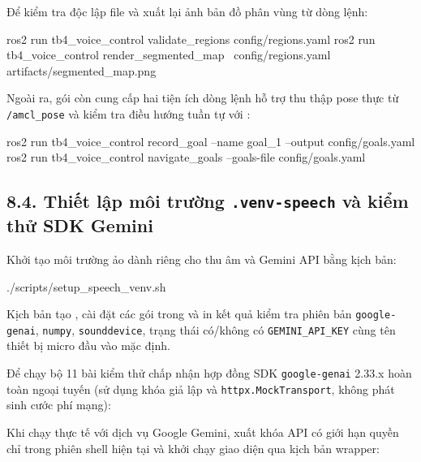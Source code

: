Để kiểm tra độc lập file  và xuất lại ảnh bản đồ phân vùng từ dòng lệnh:

\begin{svcode}
ros2 run tb4_voice_control validate_regions config/regions.yaml
ros2 run tb4_voice_control render_segmented_map \
  config/regions.yaml artifacts/segmented_map.png
\end{svcode}

Ngoài ra, gói còn cung cấp hai tiện ích dòng lệnh hỗ trợ thu thập pose thực từ \texttt{/amcl\_pose} và kiểm tra điều hướng tuần tự với :

\begin{svcode}
ros2 run tb4_voice_control record_goal --name goal_1 --output config/goals.yaml
ros2 run tb4_voice_control navigate_goals --goals-file config/goals.yaml
\end{svcode}

\subsection*{8.4. Thiết lập môi trường \texttt{.venv-speech} và kiểm thử SDK Gemini}

Khởi tạo môi trường ảo dành riêng cho thu âm và Gemini API bằng kịch bản:

\begin{svcode}
./scripts/setup_speech_venv.sh
\end{svcode}

Kịch bản tạo , cài đặt các gói trong  và in kết quả kiểm tra phiên bản \texttt{google-genai}, \texttt{numpy}, \texttt{sounddevice}, trạng thái có/không có \texttt{GEMINI\_API\_KEY} cùng tên thiết bị micro đầu vào mặc định.

Để chạy bộ 11 bài kiểm thử chấp nhận hợp đồng SDK \texttt{google-genai} 2.33.x hoàn toàn ngoại tuyến (sử dụng khóa giả lập và \texttt{httpx.MockTransport}, không phát sinh cước phí mạng):


Khi chạy thực tế với dịch vụ Google Gemini, xuất khóa API có giới hạn quyền chỉ trong phiên shell hiện tại và khởi chạy giao diện qua kịch bản wrapper:

